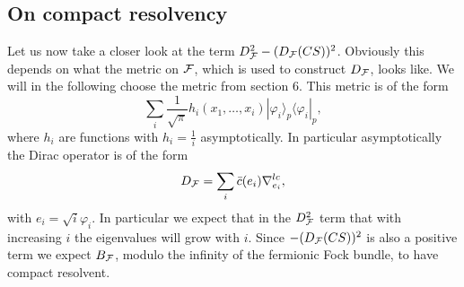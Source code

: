 \documentclass[letterpaper,12pt]{article}
\def\cf{{\cal F}}
\begin{document}
\subsection{On compact resolvency}




Let us now take a closer look at the term $D_\cf^2-(D_\cf (CS))^2$. Obviously this depends on what the metric on $\cf$, which is used to construct  $D_\cf$, looks like. We will in the following choose the metric from section 6. This metric is of the form 
$$\sum_i \frac{1}{\sqrt{\pi}} h_i(x_1,\ldots , x_i) |\varphi_i \rangle_p \langle \varphi_i |_p,$$
where $h_i$ are functions with $h_i =\frac{1}{i}$ asymptotically. In particular asymptotically the Dirac operator is of the form 
$$D_\cf  =\sum_i     \bar{c}(e_i) \nabla^{lc}_{e_i}  ,$$
with $e_i=\sqrt{i}\varphi_i $. In particular we expect that in the $D^2_\cf$ term that with increasing $i$ the eigenvalues will grow with $i$. Since $-(D_\cf(CS))^2$ is also a positive term we expect $B_\cf$, modulo the infinity of the fermionic Fock bundle, to have compact resolvent. 
\end{document}
